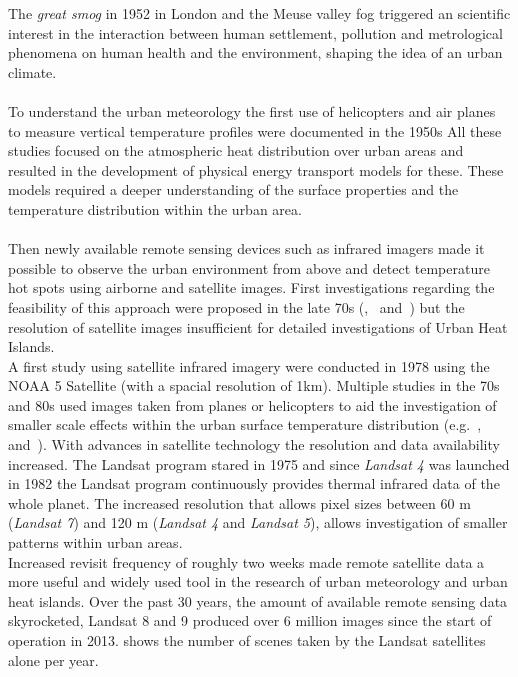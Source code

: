 \documentclass[12pt,a4paper, english,twoside]{article}
\begin{document}
  The \textit{great smog} in 1952 in London and the Meuse valley fog triggered an scientific interest in the interaction between human settlement, pollution and metrological phenomena on human health and the environment, shaping the idea of an urban climate.\\ \\ 
  To understand the urban meteorology the first use of helicopters and air planes to measure vertical temperature profiles were documented in the 1950s  
  All these studies focused on the atmospheric heat distribution over urban areas and resulted in the development of physical energy transport models for these. 
  These models required a deeper understanding of the surface properties and the temperature distribution within the urban area.\\ \\
  Then newly available remote sensing devices such as infrared imagers made it possible to observe the urban environment from above and detect temperature hot spots using airborne and satellite images.  
  First investigations regarding the feasibility of this approach were proposed in the late 70s (\cite{Watson1975},~\cite{Carlson1977} and~\cite{Block1978}) but the resolution of satellite images insufficient for detailed investigations of Urban Heat Islands.\\
  A first study using satellite infrared imagery were conducted in 1978 using the NOAA 5 Satellite (with a spacial resolution of 1km)\cite{Matson1978}. 
  Multiple studies in the 70s and 80s used images taken from planes or helicopters to aid the investigation of smaller scale effects within the urban surface temperature distribution (e.g.~\cite{Landsberg1979},~\cite{ljungberg1980use} and~\cite{Foster1981}).
  With advances in satellite technology the resolution and data availability increased. 
  The Landsat program stared in 1975 and since \textit{Landsat 4} was launched in 1982 the Landsat program continuously provides thermal infrared data of the whole planet. 
  The increased resolution that allows pixel sizes between 60 m (\textit{Landsat 7}) and 120 m (\textit{Landsat 4} and \textit{Landsat 5}), allows investigation of smaller patterns within urban areas.\\
  Increased revisit frequency of roughly two weeks made remote satellite data a more useful and widely used tool in the research of urban meteorology and urban heat islands. 
  Over the past 30 years, the amount of available remote sensing data skyrocketed, Landsat 8 and 9 produced over 6 million images since the start of operation in 2013.  shows the number of scenes taken by the Landsat satellites alone per year.
\end{document}
